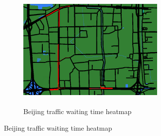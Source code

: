 \begin{figure}[h]
\centering
	\begin{subfigure}[h]{1\textwidth}
	\centering
	\includegraphics[width=0.8\textwidth,height=6cm]{img/Beijing/Beijing4}
	\caption{Beijing traffic waiting time heatmap}
	\label{fig:Beijing_waiting}
	\end{subfigure}
	

\end{figure}
